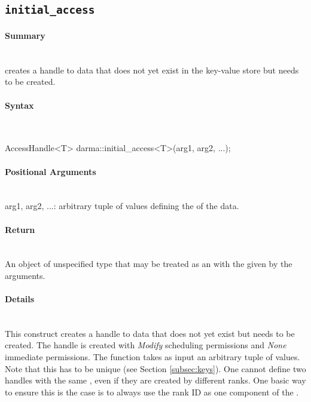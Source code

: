 \subsection{\texttt{initial\_access}}

\paragraph{Summary}\mbox{}\\ 
 creates a \gls{handle} to data that does not yet
exist in the \gls{key-value store} but needs to be created.

\paragraph{Syntax}\mbox{}\\ 
\begin{CppCode}
AccessHandle<T> darma::initial_access<T>(arg1, arg2, ...);
\end{CppCode}

\paragraph{Positional Arguments}\mbox{}\\ 
arg1, arg2, ...: arbitrary \gls{tuple} of values defining the  of the data.

\paragraph{Return}\mbox{}\\ 
An object of unspecified type that may be treated as an 
with the  given by the arguments.

\paragraph{Details}\mbox{}\\ 
This construct creates a \gls{handle} to data that does not yet 
exist but needs to be created.  The \gls{handle} is created with {\it Modify}
\gls{scheduling permissions} and {\it None} \gls{immediate permissions}.  The function takes
as input an arbitrary \gls{tuple} of values.
Note that this  has to be unique (see Section \ref{subsec:keys}).
One cannot define two \glspl{handle} with the same , even if they
are created by different \glspl{rank}.
One basic way to ensure this is the case is to always use the \gls{rank} ID
as one component of the . 


